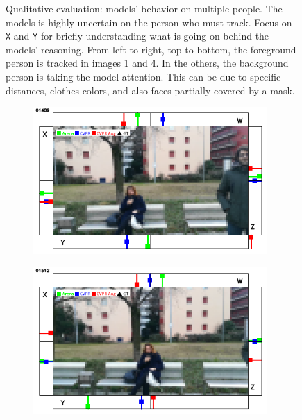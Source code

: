 \begin{figure}[H]
\begin{center}
\begin{subfigure}[h]{0.49\textwidth}
		\end{subfigure}
	\end{center}
	\vspace{-0.5cm}
	\caption[Qualitative evaluation: models' behavior on multiple people]{Qualitative evaluation: models' behavior on multiple people. The models is highly uncertain on the person who must track. Focus on \texttt{X} and \texttt{Y} for briefly understanding what is going on behind the models' reasoning. From left to right, top to bottom, the foreground person is tracked in images 1 and 4. In the others, the background person is taking the model attention. This can be due to specific distances, clothes colors, and also faces partially covered by a mask.}
	\label{fig:ql-sim-double-uncertain}
\end{figure}

\begin{figure}[H]
	\begin{center}
		\begin{subfigure}[h]{0.49\textwidth}
			\centering
			\includegraphics[width=0.98\textwidth]{"contents/images/qualitative-videos/double5-square03-1489"}
		\end{subfigure}
		\hfill
		\begin{subfigure}[h]{0.49\textwidth}
			\centering
			\includegraphics[width=0.98\textwidth]{"contents/images/qualitative-videos/double5-square03-1512"}

\end{subfigure}
\end{center}
\end{figure}
